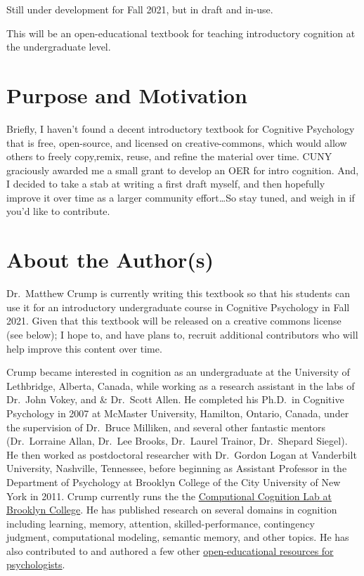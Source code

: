 \documentclass[
  oneside,
  12pt]{crumpbook}
\begin{document}
Still under development for Fall 2021, but in draft and in-use.

This will be an open-educational textbook for teaching introductory cognition at the undergraduate level.

\hypertarget{purpose-and-motivation}{%
\section{Purpose and Motivation}\label{purpose-and-motivation}}

Briefly, I haven't found a decent introductory textbook for Cognitive Psychology that is free, open-source, and licensed on creative-commons, which would allow others to freely copy,remix, reuse, and refine the material over time. CUNY graciously awarded me a small grant to develop an OER for intro cognition. And, I decided to take a stab at writing a first draft myself, and then hopefully improve it over time as a larger community effort\ldots So stay tuned, and weigh in if you'd like to contribute.

\hypertarget{about-the-authors}{%
\section{About the Author(s)}\label{about-the-authors}}

Dr.~Matthew Crump is currently writing this textbook so that his students can use it for an introductory undergraduate course in Cognitive Psychology in Fall 2021. Given that this textbook will be released on a creative commons license (see below); I hope to, and have plans to, recruit additional contributors who will help improve this content over time.

Crump became interested in cognition as an undergraduate at the University of Lethbridge, Alberta, Canada, while working as a research assistant in the labs of Dr.~John Vokey, and \& Dr.~Scott Allen. He completed his Ph.D.~in Cognitive Psychology in 2007 at McMaster University, Hamilton, Ontario, Canada, under the supervision of Dr.~Bruce Milliken, and several other fantastic mentors (Dr.~Lorraine Allan, Dr.~Lee Brooks, Dr.~Laurel Trainor, Dr.~Shepard Siegel). He then worked as postdoctoral researcher with Dr.~Gordon Logan at Vanderbilt University, Nashville, Tennessee, before beginning as Assistant Professor in the Department of Psychology at Brooklyn College of the City University of New York in 2011. Crump currently runs the the \href{https://www.crumplab.com}{Computional Cognition Lab at Brooklyn College}. He has published research on several domains in cognition including learning, memory, attention, skilled-performance, contingency judgment, computational modeling, semantic memory, and other topics. He has also contributed to and authored a few other \href{https://www.crumplab.com/Books.html}{open-educational resources for psychologists}.
\end{document}
